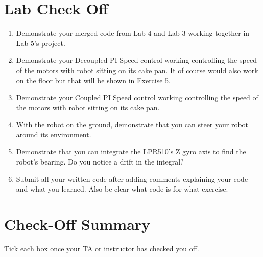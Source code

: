 \documentclass[11pt]{article}
\begin{document}
\section*{Lab Check Off}
%
\begin{enumerate}
    \item Demonstrate your merged code from Lab 4 and Lab 3 working together in Lab 5’s project.
    \item Demonstrate your Decoupled PI Speed control working controlling the speed of the motors with robot sitting on its cake pan. It of course would also work on the floor but that will be shown in Exercise 5.
    \item Demonstrate your Coupled PI Speed control working controlling the speed of the motors with robot sitting on its cake pan.
    \item With the robot on the ground, demonstrate that you can steer your robot around its environment.
    \item Demonstrate that you can integrate the LPR510’s Z gyro axis to find the robot’s bearing. Do you notice a drift in the integral?
    \item Submit all your written code after adding comments explaining your code and what you learned. Also be clear what code is for what exercise.
\end{enumerate}
%
\section*{Check-Off Summary}

Tick each box once your TA or instructor has checked you off.
%
\CheckOffSummary

\MakeFooter
\end{document}
